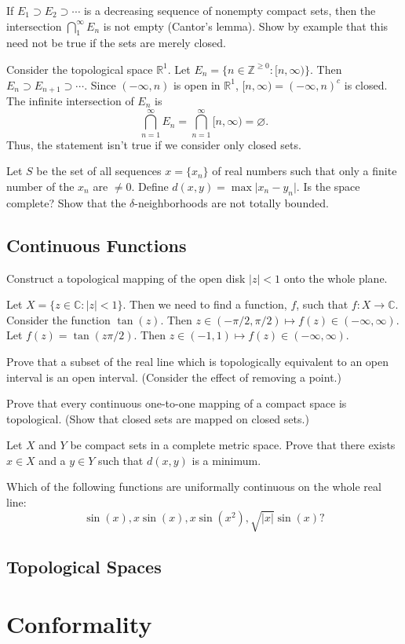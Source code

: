 \begin{exercise}
\item
  If \(E_1\supset E_2\supset\cdots\) is a decreasing sequence of nonempty
  compact sets, then the intersection \(\bigcap_1^{\infty}E_n\) is not empty
  (Cantor's lemma).
  Show by example that this need not be true if the sets are merely closed.
  \par\smallskip
  Consider the topological space \(\mathbb{R}^1\).
  Let \(E_n = \{n\in\mathbb{Z}^{\geq 0}\colon [n,\infty)\}\).
  Then \(E_n\supset E_{n + 1}\supset\cdots\).
  Since \((-\infty,n)\) is open in \(\mathbb{R}^1\),
  \([n,\infty) = (-\infty,n)^c\) is closed.
  The infinite intersection of \(E_n\) is
  \[
    \bigcap_{n = 1}^{\infty}E_n = \bigcap_{n = 1}^{\infty}[n, \infty) =
    \varnothing.
  \]
  Thus, the statement isn't true if we consider only closed sets.
\item
  Let \(S\) be the set of all sequences \(x = \{x_n\}\) of real numbers such
  that only a finite number of the \(x_n\) are \(\neq 0\).
  Define \(d(x,y) = \max\lvert x_n - y_n\rvert\).
  Is the space complete?
  Show that the \(\delta\)-neighborhoods are not totally bounded.
\end{exercise}

\subsection{Continuous Functions}

\begin{exercise}
\item
  Construct a topological mapping of the open disk \(\lvert z\rvert < 1\) onto
  the whole plane.
  \par\smallskip
  Let \(X = \{z\in\mathbb{C}\colon\lvert z\rvert < 1\}\).
  Then we need to find a function, \(f\), such that \(f\colon X\to\mathbb{C}\).
  Consider the function \(\tan(z)\).
  Then \(z\in(-\pi/2,\pi/2)\mapsto f(z)\in(-\infty,\infty)\).
  Let \(f(z) = \tan(z\pi/2)\).
  Then \(z\in(-1,1)\mapsto f(z)\in(-\infty,\infty)\).
\item
  Prove that a subset of the real line which is topologically equivalent to an
  open interval is an open interval.
  (Consider the effect of removing a point.)
\item
  Prove that every continuous one-to-one mapping of a compact space is
  topological.
  (Show that closed sets are mapped on closed sets.)
\item
  Let \(X\) and \(Y\) be compact sets in a complete metric space.
  Prove that there exists \(x\in X\) and a \(y\in Y\) such that
  \(d(x,y)\) is a minimum.
\item
  Which of the following functions are uniformally continuous on the whole
  real line:
  \[
    \sin(x),x\sin(x),x\sin(x^2),\sqrt{\lvert x\rvert}\sin(x)\mbox{?}
  \]
\end{exercise}

\subsection{Topological Spaces}

\section{Conformality}

